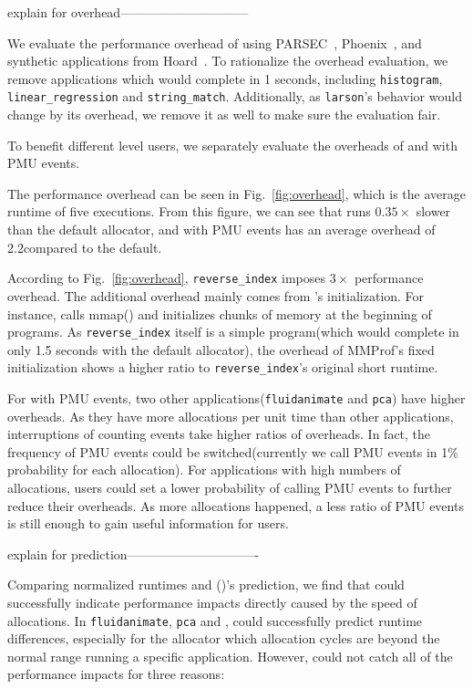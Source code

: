 explain for overhead------------------------------

We evaluate the performance overhead of \MP{} using PARSEC~\cite{parsec},  Phoenix~\cite{phoenix}, and synthetic applications from Hoard~\cite{Hoard}. To rationalize the overhead evaluation, we remove applications which would complete in 1 seconds, including \texttt{histogram}, \texttt{linear_regression} and \texttt{string_match}. Additionally, as \texttt{larson}'s behavior would change by its overhead, we remove it as well to make sure the evaluation fair. 

To benefit different level users, we separately evaluate the overheads of \MP{} and \MP{} with PMU events.

The performance overhead can be seen in Fig.~\ref{fig:overhead}, which is the average runtime of five executions. From this figure, we can see that \MP{} runs $0.35\times$ slower than the default allocator, and \MP{} with PMU events has an average overhead of 2.2\times compared to the default. 

According to Fig.~\ref{fig:overhead}, \texttt{reverse_index} imposes $3\times$ performance overhead. The additional overhead mainly comes from \MP{}'s initialization. For instance, \MP{} calls mmap() and initializes chunks of memory at the beginning of programs. As \texttt{reverse_index} itself is a simple program(which would complete in only 1.5 seconds with the default allocator), the overhead of MMProf's fixed initialization shows a higher ratio to \texttt{reverse_index}'s original short runtime.

For \MP{} with PMU events, two other applications(\texttt{fluidanimate} and \texttt{pca}) have higher overheads. As they have more allocations per unit time than other applications, interruptions of counting events take higher ratios of overheads. In fact, the frequency of PMU events could be switched(currently we call PMU events in 1\% probability for each allocation). For applications with high numbers of allocations, users could set a lower probability of calling PMU events to further reduce their overheads. As more allocations happened, a less ratio of PMU events is still enough to gain useful information for users.

explain for prediction-------------------------------

Comparing normalized runtimes and \MP()'s prediction, we find that \MP{} could successfully indicate performance impacts directly caused by the speed of allocations. In \texttt{fluidanimate}, \texttt{pca} and , \MP{} could successfully predict runtime differences, especially for the allocator which allocation cycles are beyond the normal range running a specific application. However, \MP{} could not catch all of the performance impacts for three reasons:


